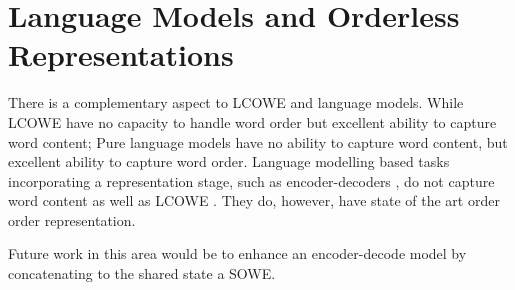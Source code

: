 \documentclass{book}
\begin{document}
\section{Language Models and Orderless Representations}

There is a complementary aspect to LCOWE and language models.
While LCOWE have no capacity to handle word order but excellent ability to capture word content;
Pure language models have no ability to capture word content, but excellent ability to capture word order.
Language modelling based tasks incorporating a representation stage, such as encoder-decoders \citep{cho-EtAl:2014:EMNLP2014}, do not capture word content as well as LCOWE \citep{ac2018probingsentencevectors}.
They do, however, have state of the art order order representation.

Future work in this area would be to enhance an encoder-decode model by concatenating to the shared state a SOWE.
\end{document}
